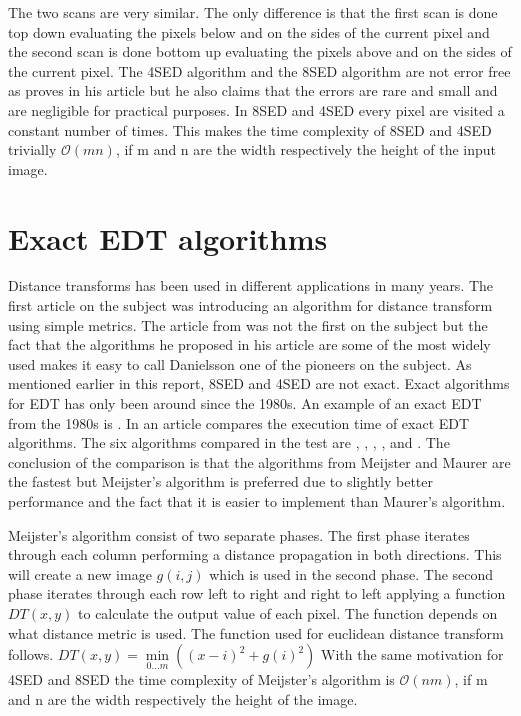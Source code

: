 The two scans are very similar. The only difference is that the first scan is done top down evaluating the pixels below and on the sides of the current pixel and the second scan is done bottom up evaluating the pixels above and on the sides of the current pixel\citep{Ragnemalm:1993}. The 4SED algorithm and the 8SED algorithm are not error free as \citet{Danielsson} proves in his article but he also claims that the errors are rare and small and are negligible for practical purposes. In 8SED and 4SED every pixel are visited a constant number of times. This makes the time complexity of 8SED and 4SED trivially $\mathcal{O}(mn)$, if m and n are the width respectively the height of the input image.
\section{Exact EDT algorithms}\label{exactEDT}
Distance transforms has been used in different applications in many years. The first article on the subject was \citet{rosenfeld1966} introducing an algorithm for distance transform using simple metrics. The article from \citet{Danielsson} was not the first on the subject but the fact that the algorithms he proposed in his article are some of the most widely used\citep{edtcompare} makes it easy to call Danielsson one of the pioneers on the subject. As mentioned earlier in this report, 8SED and 4SED are not exact. Exact algorithms for EDT has only been around since the 1980s. An example of an exact EDT from the 1980s is \citet{exactedtragnemalm}. In an article \citet{edtcompare} compares the execution time of exact EDT algorithms. The six algorithms compared in the test are \citet{meijster}, \citet{maurer}, \citet{eggers}, \citet{lotufo}, \citet{cuisenaire} and \citet{saito}. The conclusion of the comparison is that the algorithms from Meijster and Maurer are the fastest but Meijster's algorithm is preferred due to slightly better performance and the fact that it is easier to implement than Maurer's algorithm.

Meijster's algorithm consist of two separate phases. The first phase iterates through each column performing a distance propagation in both directions. This will create a new image \begin{math}g(i, j)\end{math} which is used in the second phase. The second phase iterates through each row left to right and right to left applying a function \begin{math}DT(x, y)\end{math} to calculate the output value of each pixel. The function depends on what distance metric is used. The function used for euclidean distance transform follows.\vspace{\baselineskip}\newline
\begin{math}
	DT(x, y) = \min\limits_{0\dots m}((x-i)^2+g(i)^2)
\end{math}\vspace{\baselineskip}\newline
With the same motivation for 4SED and 8SED the time complexity of Meijster's algorithm is $\mathcal{O}(nm)$, if m and n are the width respectively the height of the image.

